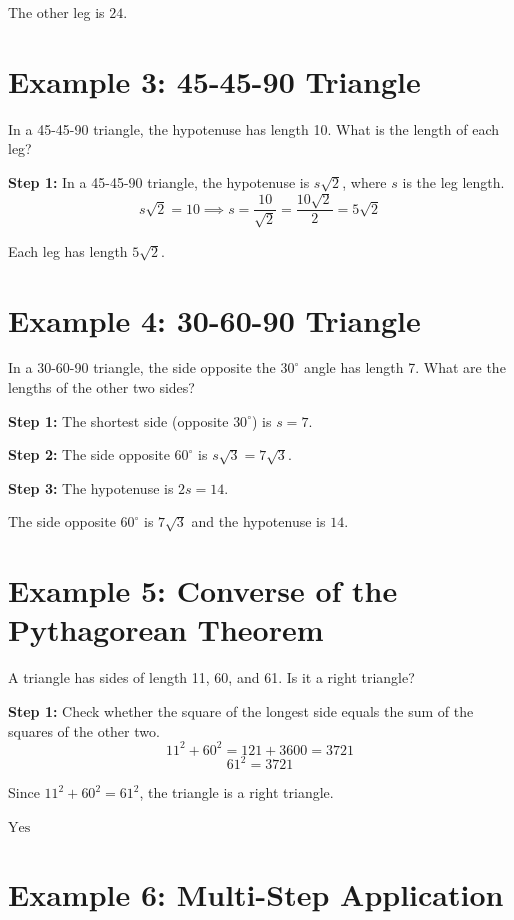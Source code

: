 \documentclass[14pt]{extarticle}
\begin{document}
The other leg is \(\boxed{24}\).

\section*{Example 3: 45-45-90 Triangle}

In a 45-45-90 triangle, the hypotenuse has length 10. What is the length of each leg?

\textbf{Step 1:} In a 45-45-90 triangle, the hypotenuse is \(s\sqrt{2}\), where \(s\) is the leg length.
\[
s\sqrt{2} = 10 \implies s = \frac{10}{\sqrt{2}} = \frac{10\sqrt{2}}{2} = 5\sqrt{2}
\]

Each leg has length \(\boxed{5\sqrt{2}}\).

\section*{Example 4: 30-60-90 Triangle}

In a 30-60-90 triangle, the side opposite the \(30^\circ\) angle has length 7. What are the lengths of the other two sides?

\textbf{Step 1:} The shortest side (opposite \(30^\circ\)) is \(s = 7\).

\textbf{Step 2:} The side opposite \(60^\circ\) is \(s\sqrt{3} = 7\sqrt{3}\).

\textbf{Step 3:} The hypotenuse is \(2s = 14\).

The side opposite \(60^\circ\) is \(\boxed{7\sqrt{3}}\) and the hypotenuse is \(\boxed{14}\).

\section*{Example 5: Converse of the Pythagorean Theorem}

A triangle has sides of length 11, 60, and 61. Is it a right triangle?

\textbf{Step 1:} Check whether the square of the longest side equals the sum of the squares of the other two.
\[
11^2 + 60^2 = 121 + 3600 = 3721
\]
\[
61^2 = 3721
\]

Since \(11^2 + 60^2 = 61^2\), the triangle is a right triangle.

\(\boxed{\text{Yes}}\)

\section*{Example 6: Multi-Step Application}
\end{document}
